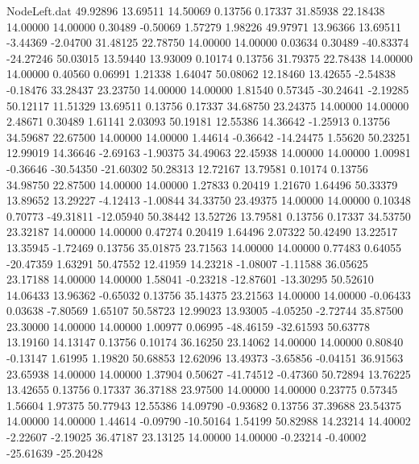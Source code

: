 \begin{filecontents}{NodeLeft.dat}
  49.92896   13.69511   14.50069     0.13756    0.17337   31.85938   22.18438   14.00000   14.00000    0.30489   -0.50069    1.57279    1.98226
  49.97971   13.96366   13.69511    -3.44369   -2.04700   31.48125   22.78750   14.00000   14.00000    0.03634    0.30489  -40.83374  -24.27246
  50.03015   13.59440   13.93009     0.10174    0.13756   31.79375   22.78438   14.00000   14.00000    0.40560    0.06991    1.21338    1.64047
  50.08062   12.18460   13.42655    -2.54838   -0.18476   33.28437   23.23750   14.00000   14.00000    1.81540    0.57345  -30.24641   -2.19285
  50.12117   11.51329   13.69511     0.13756    0.17337   34.68750   23.24375   14.00000   14.00000    2.48671    0.30489    1.61141    2.03093
  50.19181   12.55386   14.36642    -1.25913    0.13756   34.59687   22.67500   14.00000   14.00000    1.44614   -0.36642  -14.24475    1.55620
  50.23251   12.99019   14.36646    -2.69163   -1.90375   34.49063   22.45938   14.00000   14.00000    1.00981   -0.36646  -30.54350  -21.60302
  50.28313   12.72167   13.79581     0.10174    0.13756   34.98750   22.87500   14.00000   14.00000    1.27833    0.20419    1.21670    1.64496
  50.33379   13.89652   13.29227    -4.12413   -1.00844   34.33750   23.49375   14.00000   14.00000    0.10348    0.70773  -49.31811  -12.05940
  50.38442   13.52726   13.79581     0.13756    0.17337   34.53750   23.32187   14.00000   14.00000    0.47274    0.20419    1.64496    2.07322
  50.42490   13.22517   13.35945    -1.72469    0.13756   35.01875   23.71563   14.00000   14.00000    0.77483    0.64055  -20.47359    1.63291
  50.47552   12.41959   14.23218    -1.08007   -1.11588   36.05625   23.17188   14.00000   14.00000    1.58041   -0.23218  -12.87601  -13.30295
  50.52610   14.06433   13.96362    -0.65032    0.13756   35.14375   23.21563   14.00000   14.00000   -0.06433    0.03638   -7.80569    1.65107
  50.58723   12.99023   13.93005    -4.05250   -2.72744   35.87500   23.30000   14.00000   14.00000    1.00977    0.06995  -48.46159  -32.61593
  50.63778   13.19160   14.13147     0.13756    0.10174   36.16250   23.14062   14.00000   14.00000    0.80840   -0.13147    1.61995    1.19820
  50.68853   12.62096   13.49373    -3.65856   -0.04151   36.91563   23.65938   14.00000   14.00000    1.37904    0.50627  -41.74512   -0.47360
  50.72894   13.76225   13.42655     0.13756    0.17337   36.37188   23.97500   14.00000   14.00000    0.23775    0.57345    1.56604    1.97375
  50.77943   12.55386   14.09790    -0.93682    0.13756   37.39688   23.54375   14.00000   14.00000    1.44614   -0.09790  -10.50164    1.54199
  50.82988   14.23214   14.40002    -2.22607   -2.19025   36.47187   23.13125   14.00000   14.00000   -0.23214   -0.40002  -25.61639  -25.20428

\end{filecontents}
